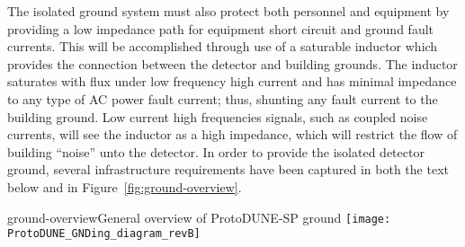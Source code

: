 The isolated ground system must also protect both personnel and equipment by providing a low impedance path for equipment short circuit and ground fault currents.  This will be accomplished through use of a saturable inductor which provides the connection between the detector and building grounds.  The inductor saturates with flux under low frequency high current and has minimal impedance to any type of AC power fault current; thus, shunting any fault current to the building ground.  Low current high frequencies signals, such as coupled noise currents, will see the inductor as a high impedance, which will restrict the flow of building “noise” unto the detector.
In order to provide the isolated detector ground, several infrastructure requirements have been captured in both the text below and in Figure~\ref{fig:ground-overview}. 

\begin{cdrfigure}{ground-overview}{General overview of ProtoDUNE-SP ground}
\texttt{[image: ProtoDUNE\_GNDing\_diagram\_revB]}
\end{cdrfigure}


